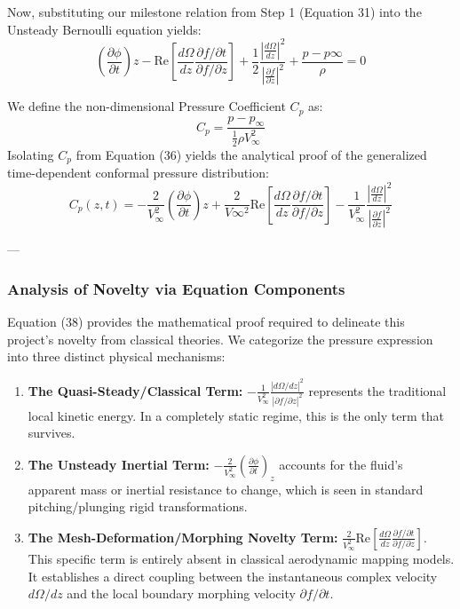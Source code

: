 \documentclass[12pt,a4paper]{article}
\begin{document}
Now, substituting our milestone relation from Step 1 (Equation 31) into the Unsteady Bernoulli equation yields:
\begin{equation}
    \left( \frac{\partial \phi}{\partial t} \right)z - \text{Re} \left[ \frac{d\Omega}{dz} \frac{\partial f / \partial t}{\partial f / \partial z} \right] + \frac{1}{2} \frac{\left| \frac{d\Omega}{dz} \right|^2}{\left| \frac{\partial f}{\partial z} \right|^2} + \frac{p - p\infty}{\rho} = 0
\end{equation}

We define the non-dimensional Pressure Coefficient $C_p$ as:
\begin{equation}
    C_p = \frac{p - p_\infty}{\frac{1}{2}\rho V_\infty^2}
\end{equation}
Isolating $C_p$ from Equation (36) yields the analytical proof of the generalized time-dependent conformal pressure distribution:
\begin{equation}
    \boxed{C_p(z,t) = -\frac{2}{V_\infty^2} \left( \frac{\partial \phi}{\partial t} \right)z + \frac{2}{V\infty^2} \text{Re} \left[ \frac{d\Omega}{dz} \frac{\partial f / \partial t}{\partial f / \partial z} \right] - \frac{1}{V_\infty^2} \frac{\left| \frac{d\Omega}{dz} \right|^2}{\left| \frac{\partial f}{\partial z} \right|^2}}
\end{equation}

---

\subsubsection{Analysis of Novelty via Equation Components}
Equation (38) provides the mathematical proof required to delineate this project's novelty from classical theories. We categorize the pressure expression into three distinct physical mechanisms:
\begin{enumerate}
    \item \textbf{The Quasi-Steady/Classical Term:} $-\frac{1}{V_\infty^2} \frac{|d\Omega/dz|^2}{|\partial f/\partial z|^2}$ represents the traditional local kinetic energy. In a completely static regime, this is the only term that survives.
    \item \textbf{The Unsteady Inertial Term:} $-\frac{2}{V_\infty^2} \left( \frac{\partial \phi}{\partial t} \right)_z$ accounts for the fluid's apparent mass or inertial resistance to change, which is seen in standard pitching/plunging rigid transformations.
    \item \textbf{The Mesh-Deformation/Morphing Novelty Term:} $\frac{2}{V_\infty^2} \text{Re} \left[ \frac{d\Omega}{dz} \frac{\partial f / \partial t}{\partial f / \partial z} \right]$. This specific term is entirely absent in classical aerodynamic mapping models. It establishes a direct coupling between the instantaneous complex velocity $d\Omega/dz$ and the local boundary morphing velocity $\partial f/\partial t$.
\end{enumerate}
\end{document}
